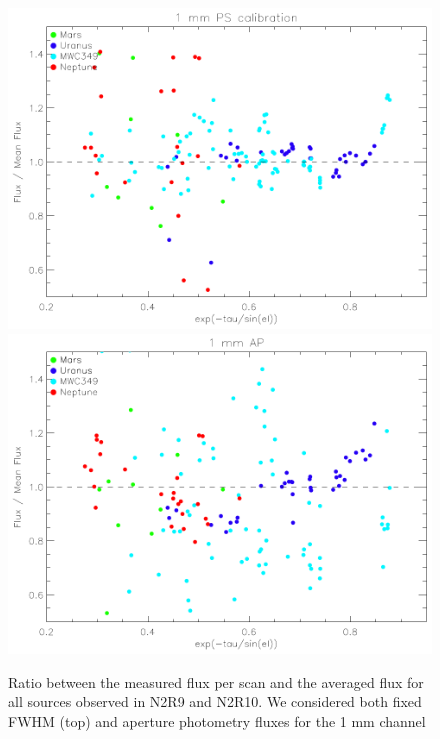 \begin{figure}[ht]
\begin{center}
\includegraphics[clip, angle=0, scale = 0.7]{Figures/flux_1mm_ratio_run22_23.pdf}
\includegraphics[clip, angle=0, scale = 0.7]{Figures/flux_1mm_ap_ratio_run22_23.pdf}
\caption{Ratio between the measured flux per scan and the averaged flux for all sources observed in N2R9 and N2R10. We considered both fixed FWHM (top) and aperture photometry fluxes for the 1 mm channel }
\label{fig:fluxvsscan}
\end{center}
\end{figure}

